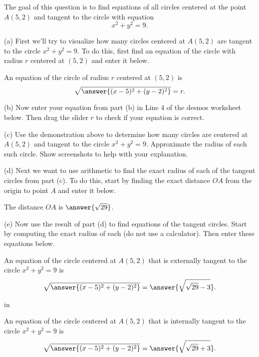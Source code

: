 \documentclass{ximera}
\newcommand{\pskip}{\vskip 0.1 in}
\begin{document}
\begin{question}  \label{Q:DFRr43345t22}
The goal of this question is to find equations of all circles centered at the point $A(5,2)$ and tangent to the circle with equation
\[
    x^2 + y^2 = 9.
\]

(a) First we'll try to visualize how many circles centered at $A(5,2)$ are tangent to the circle $x^2+y^2=9$. To do this, first find an equation of the circle with radius $r$ centered at $(5,2)$ and enter it below.

An equation of the circle of radius $r$ centered at $(5,2)$ is
\[
        \sqrt{\answer{(x-5)^2 + (y-2)^2}} = r .
\]

(b) Now enter your equation from part (b) in Line 4 of the desmos worksheet below. Then drag the slider $r$ to check if your equation is correct.

\begin{onlineOnly}
    \begin{center}
\end{center}
\end{onlineOnly}

\begin{freeResponse}
(c) Use the demonstration above to determine how many circles are centered at $A(5,2)$ and tangent to the circle $x^2+y^2=9$. Approximate the radius of each such circle. Show screenshots to help with your explanation.
\end{freeResponse}

(d) Next we want to use arithmetic to find the exact radius of each of the tangent circles from part (c). To do this, start by finding the exact distance $OA$ from the origin to point $A$ and enter it below.

The distance $OA$ is $\answer{\sqrt{29}}$.

(e) Now use the result of part (d) to find equations of the tangent circles. Start by computing the exact radius of each (do not use a calculator). Then enter these equations below.

An equation of the circle centered at $A(5,2)$ that is externally tangent to the circle $x^2 + y^2 = 9$ is
\[
     \sqrt{\answer{(x-5)^2 + (y-2)^2}} = \answer{\sqrt{\sqrt{29}-3}} .
\]

\pskip

An equation of the circle centered at $A(5,2)$ that is internally tangent to the circle $x^2 + y^2 = 9$ is
\[
     \sqrt{\answer{(x-5)^2 + (y-2)^2}} = \answer{\sqrt{\sqrt{29}+3}} .
\]



\end{question}
\end{document}
